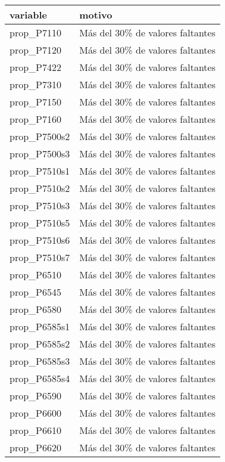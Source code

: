 \begin{table}[ht]
\centering
\begin{tabular}{ll}
  \toprule
variable & motivo \\ 
  \midrule
prop\_P7110 & Más del 30\% de valores faltantes \\ 
  prop\_P7120 & Más del 30\% de valores faltantes \\ 
  prop\_P7422 & Más del 30\% de valores faltantes \\ 
  prop\_P7310 & Más del 30\% de valores faltantes \\ 
  prop\_P7150 & Más del 30\% de valores faltantes \\ 
  prop\_P7160 & Más del 30\% de valores faltantes \\ 
  prop\_P7500s2 & Más del 30\% de valores faltantes \\ 
  prop\_P7500s3 & Más del 30\% de valores faltantes \\ 
  prop\_P7510s1 & Más del 30\% de valores faltantes \\ 
  prop\_P7510s2 & Más del 30\% de valores faltantes \\ 
  prop\_P7510s3 & Más del 30\% de valores faltantes \\ 
  prop\_P7510s5 & Más del 30\% de valores faltantes \\ 
  prop\_P7510s6 & Más del 30\% de valores faltantes \\ 
  prop\_P7510s7 & Más del 30\% de valores faltantes \\ 
  prop\_P6510 & Más del 30\% de valores faltantes \\ 
  prop\_P6545 & Más del 30\% de valores faltantes \\ 
  prop\_P6580 & Más del 30\% de valores faltantes \\ 
  prop\_P6585s1 & Más del 30\% de valores faltantes \\ 
  prop\_P6585s2 & Más del 30\% de valores faltantes \\ 
  prop\_P6585s3 & Más del 30\% de valores faltantes \\ 
  prop\_P6585s4 & Más del 30\% de valores faltantes \\ 
  prop\_P6590 & Más del 30\% de valores faltantes \\ 
  prop\_P6600 & Más del 30\% de valores faltantes \\ 
  prop\_P6610 & Más del 30\% de valores faltantes \\ 
  prop\_P6620 & Más del 30\% de valores faltantes \\ 

\end{tabular}
\end{table}

